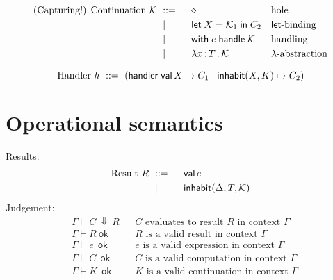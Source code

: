 \documentclass{article}
\newcommand{\bnf}{\ \mathrel{{:}{:}{=}}\ }
\newcommand{\bnfor}{\ \mid\ \ }
\newcommand{\x}{x}     %
\newcommand{\C}{C}     %
\newcommand{\K}{K}     %
\newcommand{\X}{X}     %
\newcommand{\e}{e}     %
\newcommand{\rgn}{r}   %
\newcommand{\h}{h}     %
\newcommand{\T}{T}     %
\newcommand{\val}{\mathsf{val}\,} %
\newcommand{\letin}[1]{\mathsf{let}\; #1 \;\mathsf{in}\;} %
\newcommand{\inhabitPat}[2]{\mathsf{inhabit}(#1, #2)} %
\newcommand{\inhabit}[3]{\mathsf{inhabit}(#1, #2, #3)} %
\newcommand{\withhandle}[1]{\mathsf{with}\;#1\;\mathsf{handle}\;} %
\newcommand{\abs}[1]{\mathsf{abs}\;#1\;\mathsf{in}\;} %
\newcommand{\lam}[2]{\lambda #1 \,{:}\, #2 \,.\,} %
\newcommand{\handler}[5]{\mathsf{handler}\; \val #1 \mapsto #2 \mid \inhabitPat{#3}{#4} \mapsto #5}
\newcommand{\cont}{{\cal K}}     %
\newcommand{\hole}{\diamond}
\newcommand{\G}{\Gamma}
\newcommand{\D}{\Delta}
\newcommand{\evalto}[3][\G]{#1 \vdash #2 \ \Downarrow\  #3}
\newcommand{\resultok}[2][\G]{#1 \vdash #2 \ \mathsf{ok}}
\newcommand{\eok}[2][\G]{#1 \vdash #2 \ \ \mathsf{ok}}
\newcommand{\cok}[2][\G]{#1 \vdash #2 \ \ \mathsf{ok}}
\newcommand{\kok}[2][\G]{#1 \vdash #2 \ \ \mathsf{ok}}
\newcommand{\typicalhandler}{\handler{\X}{\C_1}{\X}{\K}{\C_2}}
\begin{document}
%
\begin{equation*}
  \text{(Capturing!) Continuation $\cont$}
  \begin{aligned}[t]
    &\bnf   {} && \hole                && \text{hole} \\
    &\bnfor {} && \letin{\X = \cont_1} \C_2  && \text{$\mathsf{let}$-binding} \\
    &\bnfor {} && \withhandle{\e} \cont && \text{handling} \\
    &\bnfor {} && \lam{\x}{\T} \cont   && \text{$\lambda$-abstraction} \\
  \end{aligned}
\end{equation*}

%
\begin{equation*}
  \text{Handler $\h$}
  \bnf (\typicalhandler)\\
\end{equation*}



\section{Operational semantics}
\label{sec:oper-semant}

Results:
%
\begin{equation*}
  \text{Result $R$}
  \begin{aligned}[t]
    &\bnf   {} && \val \e \\
    &\bnfor {} && \inhabit{\D}{\T}{\cont} \\
  \end{aligned}
\end{equation*}
%
Judgement:
%
\begin{align*}
  &\evalto[\G]{C}{R} &&\text{$C$ evaluates to result $R$ in context $\G$} \\
  &\resultok[\G]{R}  &&\text{$R$ is a valid result in context $\G$} \\
  &\eok[\G]{\e} &&\text{$\e$ is a valid expression in context $\G$} \\
  &\cok[\G]{\C} &&\text{$\C$ is a valid computation in context $\G$} \\
  &\kok[\G]{\K} &&\text{$\K$ is a valid continuation in context $\G$} \\
\end{align*}
%
\end{document}

